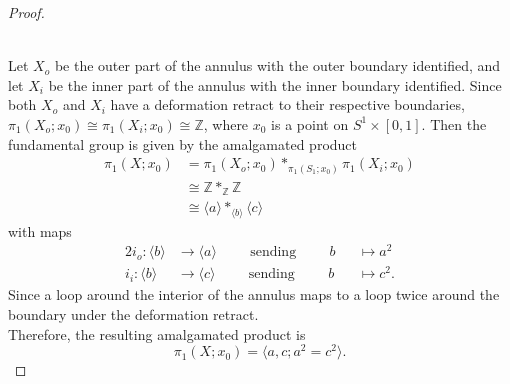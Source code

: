\documentclass{article}
\begin{document}
\begin{proof}
\begin{figure}[h]
  \end{figure}\\
  Let $X_o$ be the outer part of the annulus with the outer boundary identified,
  and  let $X_i$ be the inner part of the annulus with the inner boundary
  identified. Since both $X_o$ and $X_i$ have a deformation retract to their
  respective boundaries,
  $\pi_1(X_o; x_0) \cong \pi_1(X_i; x_0) \cong \mathbb Z$, where $x_0$ is a
  point on $S^1 \times [0, 1]$.
  Then the fundamental group is given by the amalgamated product \begin{align*}
    \pi_1(X; x_0) &= \pi_1(X_o; x_0) *_{\pi_1(S_1; x_0)} \pi_1(X_i; x_0) \\
    &\cong \mathbb Z *_{\mathbb Z} \mathbb Z \\
    &\cong \langle a \rangle *_{\langle b \rangle} \langle c \rangle
  \end{align*}
  with maps \begin{alignat*}{2}
    i_o\colon \langle b \rangle &\rightarrow \langle a \rangle
    \hspace{1cm}\text{sending}\hspace{1cm}
    b &&\mapsto a^2
    \\
    i_i\colon \langle b \rangle &\rightarrow \langle c \rangle
    \hspace{1cm}\text{sending}\hspace{1cm}
    b &&\mapsto c^2.
  \end{alignat*}
  Since a loop around the interior of the annulus maps to a loop twice around
  the boundary under the deformation retract.
  \\
  Therefore, the resulting amalgamated product is \[
    \pi_1(X; x_0) = \langle a, c; a^2 = c^2 \rangle.
  \]

\end{proof}
\end{document}
